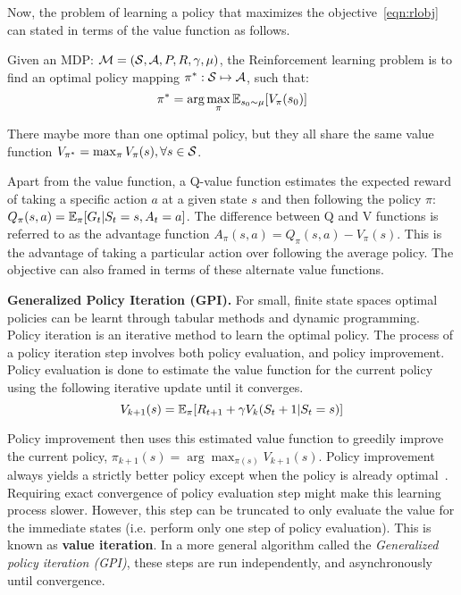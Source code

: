 Now, the problem of learning a policy that maximizes the objective~\ref{eqn:rlobj} can stated in
terms of the value function as follows.

\begin{definition}
	Given an MDP: $\mathcal{M} = (\mathcal{S}, \mathcal{A}, P, R, \gamma, \mu)$, the Reinforcement learning problem is to find an
	optimal policy mapping $\pi^*: \mathcal{S} \mapsto \mathcal{A}$, such that:
	$$\pi^* = \arg \max_\pi \mathbb{E}_{s_0 \sim \mu}[V_{\pi}(s_0)]$$
\end{definition}

There maybe more than one optimal policy, but they all share the same value function
$V_{\pi^{\ast}} = \max_{\pi} V_\pi(s), \forall s \in \mathcal{S}$.

Apart from the value function, a Q-value function estimates the expected reward of taking a
specific action $a$ at a given state $s$ and then following the policy $\pi$: $ Q_{\pi}(s, a) =
	\mathbb{E}_{\pi}[G_t | S_t = s, A_t = a] $.
The difference between Q and V functions is referred to as the advantage function $A_\pi(s,a) =
	Q_\pi(s,a) - V_\pi(s)$.
This is the advantage of taking a particular action over following the average policy.
The objective can also framed in terms of these alternate value functions.

\textbf{Generalized Policy Iteration (GPI).}
For small, finite state spaces optimal policies can be learnt through tabular methods and dynamic
programming.
Policy iteration is an iterative method to learn the optimal policy.
The process of a policy iteration step involves both policy evaluation, and policy improvement.
Policy evaluation is done to estimate the value function for the current policy using the following
iterative update until it converges.
$$V_{k+1}(s) = \mathbb{E}_{\pi} [R_{t+1} + \gamma V_k(S_t+1 | S_t = s)]$$

Policy improvement then uses this estimated value function to greedily improve the current policy,
$\pi_{k+1}(s) = \arg \max_{\pi(s)} V_{k+1}(s)$.
Policy improvement always yields a strictly better policy except when the policy is already
optimal~\cite{suttonReinforcement2018}.
Requiring exact convergence of policy evaluation step might make this learning process slower.
However, this step can be truncated to only evaluate the value for the immediate states (i.e.
perform only one step of policy evaluation).
This is known as \textbf{value iteration}.
In a more general algorithm called the \textit{Generalized policy iteration (GPI)}, these steps are
run independently, and asynchronously until convergence.

